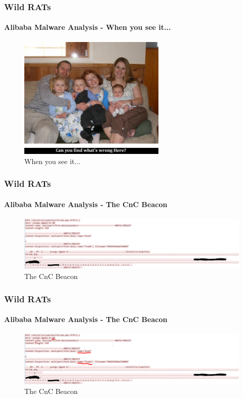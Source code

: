 \documentclass[aspectratio=169]{beamer}
\begin{document}
\begin{frame}
  \frametitle{Wild RATs}
  \framesubtitle{Alibaba Malware Analysis - When you see it...}
  \begin{center}
    \begin{figure}
      \includegraphics[width=7cm,keepaspectratio]{whats_wrong_here}
      \caption{When you see it...}
    \end{figure}
  \end{center}
\end{frame}

\begin{frame}
  \frametitle{Wild RATs}
  \framesubtitle{Alibaba Malware Analysis - The CnC Beacon}
  \begin{center}
    \begin{figure}
      \includegraphics[width=14cm,keepaspectratio]{alibaba_http}
      \caption{The CnC Beacon}
    \end{figure}
  \end{center}
\end{frame}

\begin{frame}
  \frametitle{Wild RATs}
  \framesubtitle{Alibaba Malware Analysis - The CnC Beacon}
  \begin{center}
    \begin{figure}
      \includegraphics[width=14cm,keepaspectratio]{alibaba_http_highlight}
      \caption{The CnC Beacon}
    \end{figure}
  \end{center}
\end{frame}
\end{document}
